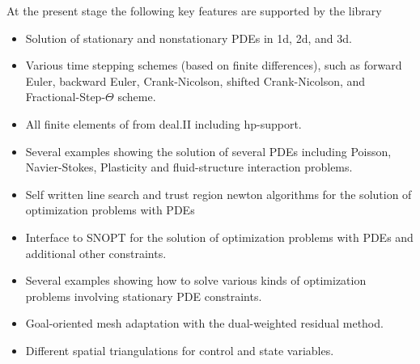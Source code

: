 \documentclass[prodmode,acmtoms]{acmsmall}
\numberwithin{equation}{section}
\begin{document}
%

At the present stage the following key features are supported by the library
\begin{itemize}
\item Solution of stationary and nonstationary PDEs in 1d, 2d, and 3d.
\item Various time stepping schemes (based on finite differences), 
  such as forward Euler, backward Euler,
  Crank-Nicolson, shifted Crank-Nicolson, and Fractional-Step-$\Theta$ scheme.
\item All finite elements of from deal.II including hp-support.
\item Several examples showing the solution of several PDEs including
   Poisson, Navier-Stokes, Plasticity and fluid-structure interaction problems. 
\item Self written line search and trust region newton algorithms for the 
   solution of optimization problems with PDEs \cite{NoWr00}
\item Interface to SNOPT for the solution of optimization problems with PDEs and
  additional other constraints.
\item Several examples showing how to solve various kinds of optimization problems
  involving stationary PDE constraints.
\item Goal-oriented mesh adaptation with the dual-weighted residual method.
\item Different spatial triangulations for control and state variables.
\end{itemize}
\end{document}
